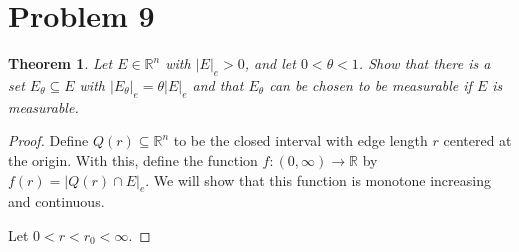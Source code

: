 \documentclass[10pt,a4paper]{article}
\theoremstyle{theorem}
\newtheorem{theorem}{Theorem}
\theoremstyle{definition}
\begin{document}
\section*{Problem 9}
\begin{theorem}
Let $E \in \mathbb{R}^n$ with $|E|_e > 0$, and let $0 < \theta < 1$. Show that there is a set $E_\theta \subseteq E$ with $|E_\theta|_e = \theta |E|_e$ and that $E_\theta$ can be chosen to be measurable if $E$ is measurable.
\end{theorem}

\begin{proof}
Define $Q(r) \subseteq \mathbb{R}^n$ to be the closed interval with edge length $r$ centered at the origin. With this, define the function $f:(0, \infty) \to \mathbb{R}$ by $f(r) = |Q(r) \cap E|_e$. We will show that this function is monotone increasing and continuous.

Let $0 < r < r_0 < \infty$.
\end{proof}
\end{document}
